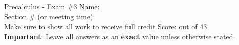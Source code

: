 \documentclass[addpoints]{exam}
\begin{document}
\begin{flushleft}
Precalculus -  Exam \#3 \hfill  Name: \underline{\hspace{2.5 in}} \\  
  \hfill  Section \# (or meeting time):  \underline{\hspace{1in}}\\  %
Make sure to show all work to receive full credit  \hfill  Score: \underline{\hspace{0.5in}} out of 43 \\
{\bf Important}: Leave all answers as an \underline{\bf exact} value unless otherwise stated.
\end{flushleft}
\end{document}
